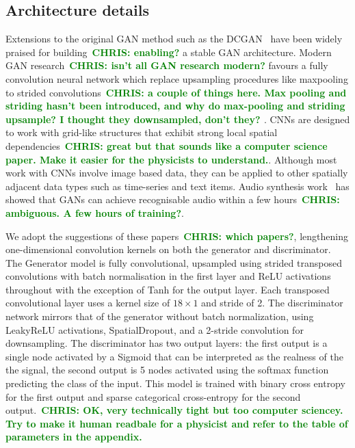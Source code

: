 \documentclass[12pt]{iopart}
\newcommand{\chris}[1]{\textbf{\textcolor{green}{CHRIS: #1}}}
\begin{document}
\subsection{Architecture details}

%
Extensions to the original \ac{GAN} method such as the
\ac{DCGAN}~\cite{Radford2015} have been widely praised for
building~\chris{enabling?} a stable \ac{GAN} architecture. Modern \ac{GAN}
research~\chris{isn't all GAN research modern?} favours a fully convolution
neural network which replace upsampling procedures like maxpooling to strided
convolutions~\chris{a couple of things here. Max pooling and striding hasn't
been introduced, and why do max-pooling and striding upsample? I thought they
downsampled, don't they? }. \acp{CNN} are designed to work with grid-like
structures that exhibit strong local spatial dependencies~\chris{great but that
sounds like a computer science paper. Make it easier for the physicists to
understand.}. Although most work with \acp{CNN} involve image based data, they
can be applied to other spatially adjacent data types such as time-series and
text items. Audio synthesis work~\cite{DBLP:journals/corr/abs-1809-11096} has
showed that \acp{GAN} can achieve recognisable audio within a few
hours~\chris{ambiguous. A few hours of training?}. 

%
We adopt the suggestions of these papers~\chris{which papers?}, lengthening
one-dimensional convolution kernels on both the generator and discriminator.
The Generator model is fully convolutional, upsampled using strided transposed
convolutions with batch normalisation in the first layer and ReLU activations
throughout with the exception of Tanh for the output layer. Each transposed
convolutional layer uses a kernel size of $18\times 1$ and stride of 2. The
discriminator network mirrors that of the generator without batch
normalization, using LeakyReLU activations, SpatialDropout, and a 2-stride
convolution for downsampling. The discriminator has two output layers: the
first output is a single node activated by a Sigmoid that can be interpreted as
the realness of the the signal, the second output is 5 nodes activated using
the softmax function predicting the class of the input.  This model is trained
with binary cross entropy for the first output and sparse categorical
cross-entropy for the second output.~\chris{OK, very technically tight but too
computer sciencey. Try to make it human readbale for a physicist and refer to
the table of parameters in the appendix.}
\end{document}

